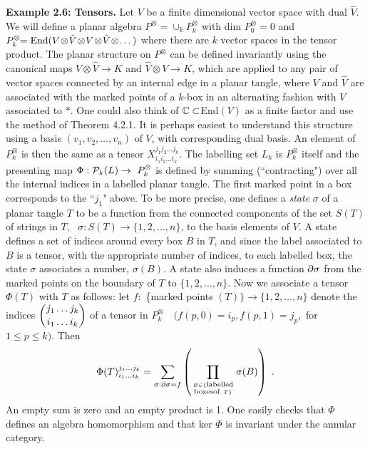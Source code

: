 \bs
\bs
{\bf Example 2.6: Tensors.}
Let $V$ be a finite dimensional vector space with dual $\hat V$.
We will define a planar algebra $P^{\otimes}\!\!=\!\cup_k
P^{\otimes}_k$ with dim $P_0^{\otimes}\!=\!0$ and
$P_k^{\otimes}\!\!={\op{End}}(V\!\otimes\!\hat V\!\otimes
\!V\!\otimes\!
\hat V\!\otimes\!\dots)$ where there are $k$ vector spaces in the
tensor product. The planar structure on $P^{\otimes}$ can be defined
invariantly using the canonical maps $V\otimes\hat V\to K$ and
$\hat V\otimes  V\to K$, which are applied to any pair of vector
spaces connected by an internal edge in a planar tangle, where $V$
and $\hat V$ are associated with the marked points of a $k$-box in
an alternating fashion with $V$ associated to $*$. One could
also think of $\Bbb C\subset$End$(V)$ as a finite factor
and use the method of Theorem 4.2.1.
 It is perhaps easiest to understand this structure using
a basis
$(v_1,v_2,\dots ,v_n)$ of $V$, with corresponding dual basis.
An element of
$P^\otimes_k$ is then the same as a tensor
$X^{j_1j_2\dots j_k}_{i_1i_2\dots i_k}$. The labelling set $L_k$ is
$P^\otimes_k$ itself and the presenting map $\Phi:{\cal P}_k(L)\to\
P^\otimes_k$ is defined by summing (``contracting") over all the
internal indices  in a labelled planar tangle. The first marked
point in a box corresponds to the ``$j_1$" above. To be more
precise, one defines a {\it state} $\sigma$ of a planar tangle $T$
to be a function from the connected components of the set $S(T)$
of strings in $T$, \ $\sigma: S(T)\to\{1,2,\dots ,n\}$, to the basis
elements of $V$. A state defines a set of indices around every box
$B$ in $T$, and since the label associated to $B$ is a tensor, with
the appropriate number of indices, to each labelled box, the state
$\sigma$ associates a number, $\sigma(B)$. A state also induces a
function $\partial\sigma$ from the marked points on the boundary of $T$
to $\{1,2,\dots , n\}$. Now we associate a tensor $\Phi(T)$ with
$T$ as follows: let $f:$ \{marked points $(T)\}\to\{1,2,\dots ,n\}$
denote the indices 
$\displaystyle{{j_1\ldots j_k}\choose {i_1 \ldots  i_k}}$
of a tensor in $P^\otimes_k\quad (f(p,0)=i_p,f(p,1)=j_p,$ for $ 1\leq p \leq k)$. Then
$$
\Phi(T)^{j_1\dots j_k}_{i_1\dots i_k}=\sum_{\sigma:\partial\sigma =f}
\left( \prod_{B\in\{ {\scriptstyle{\rm labelled}}\atop {\scriptstyle{\rm boxes of}} \ T\}
} \sigma(B)\right) \ .
$$
An empty sum is zero and an empty product is 1. One easily checks
that $\Phi$ defines an algebra homomorphism
and that ker $\Phi$ is invariant under the annular category.

